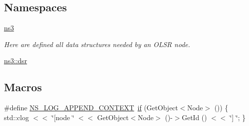 \subsection*{Namespaces}
\begin{DoxyCompactItemize}
\item 
 \hyperlink{namespacens3}{ns3}
\begin{DoxyCompactList}\small\item\em Here are defined all data structures needed by an O\+L\+SR node. \end{DoxyCompactList}\item 
 \hyperlink{namespacens3_1_1dsr}{ns3\+::dsr}
\end{DoxyCompactItemize}
\subsection*{Macros}
\begin{DoxyCompactItemize}
\item 
\#define \hyperlink{dsr-options_8cc_abe50035652d407c40bdaef78214c4955}{N\+S\+\_\+\+L\+O\+G\+\_\+\+A\+P\+P\+E\+N\+D\+\_\+\+C\+O\+N\+T\+E\+XT}~\hyperlink{loss__OH__large__cities__urban_8m_ac77b6cfa3068152087725fe54b4ae8c8}{if} (Get\+Object$<$Node$>$ ()) \{ std\+::clog $<$$<$ \char`\"{}\mbox{[}node \char`\"{} $<$$<$ Get\+Object$<$Node$>$ ()-\/$>$Get\+Id () $<$$<$ \char`\"{}\mbox{]} \char`\"{}; \}
\end{DoxyCompactItemize}
